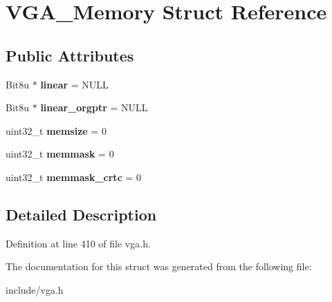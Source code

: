\hypertarget{structVGA__Memory}{\section{V\-G\-A\-\_\-\-Memory Struct Reference}
\label{structVGA__Memory}
}
\subsection*{Public Attributes}
\begin{DoxyCompactItemize}
\item 
\hypertarget{structVGA__Memory_ad97ba657c0183be121936eeb11436171}{Bit8u $\ast$ {\bfseries linear} = N\-U\-L\-L}\label{structVGA__Memory_ad97ba657c0183be121936eeb11436171}

\item 
\hypertarget{structVGA__Memory_a8b4dbdb74bb5fe961f686c16cae8a11c}{Bit8u $\ast$ {\bfseries linear\-\_\-orgptr} = N\-U\-L\-L}\label{structVGA__Memory_a8b4dbdb74bb5fe961f686c16cae8a11c}

\item 
\hypertarget{structVGA__Memory_aa7ab72d06d3ddb3a945f307865b8d902}{uint32\-\_\-t {\bfseries memsize} = 0}\label{structVGA__Memory_aa7ab72d06d3ddb3a945f307865b8d902}

\item 
\hypertarget{structVGA__Memory_abdbc1c51a3263d179ee67dc7482bf339}{uint32\-\_\-t {\bfseries memmask} = 0}\label{structVGA__Memory_abdbc1c51a3263d179ee67dc7482bf339}

\item 
\hypertarget{structVGA__Memory_ac09f53aaff79d38b002bcf28d04009de}{uint32\-\_\-t {\bfseries memmask\-\_\-crtc} = 0}\label{structVGA__Memory_ac09f53aaff79d38b002bcf28d04009de}

\end{DoxyCompactItemize}


\subsection{Detailed Description}


Definition at line 410 of file vga.\-h.



The documentation for this struct was generated from the following file\-:\begin{DoxyCompactItemize}
\item 
include/vga.\-h\end{DoxyCompactItemize}
